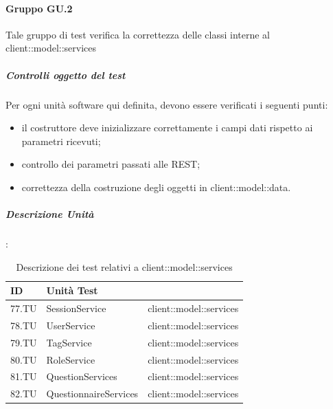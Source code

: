 \documentclass[12pt,a4paper]{article}
\begin{document}
\paragraph{Gruppo GU.2 }
Tale gruppo di test verifica la correttezza delle classi interne al  client::model::services
\subparagraph{Controlli oggetto del test}
Per ogni unità software qui definita, devono essere verificati i seguenti punti:
\begin{itemize}
	\item il costruttore deve inizializzare correttamente i campi dati rispetto ai parametri ricevuti;
	\item controllo dei parametri passati alle  REST;
	\item correttezza della costruzione degli oggetti in client::model::data.
\end{itemize}
\subparagraph{Descrizione Unità}:
\begin{table}[H]
	\begin{center}
		\begin{tabular}{p{} p{} p{}}
			\toprule
			\textbf{ID}   & \textbf{Unità Test}	& \textbf{\mgls{package}} \\ \midrule
			\midrule
			77.TU & SessionService & client::model::services\\ \midrule
			78.TU & UserService & client::model::services\\ \midrule
			79.TU & TagService & client::model::services\\ \midrule
			80.TU & RoleService & client::model::services\\ \midrule
			81.TU & QuestionServices & client::model::services\\ \midrule
			82.TU & QuestionnaireServices & client::model::services\\ \midrule
			\bottomrule
		\end{tabular}
	\end{center}
	\caption{Descrizione dei test relativi a client::model::services}
\end{table}
\end{document}
